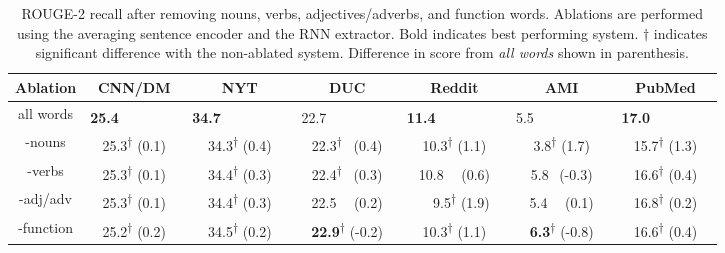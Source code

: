 \begin{table*}[ht]
\center
\begin{tabular}{ccccccc}
    \toprule
    \multirow{1}{*}{\textbf{Ablation}}  & \multicolumn{1}{c}{\textbf{CNN/DM}} & \multicolumn{1}{c}{\textbf{NYT}} & \multicolumn{1}{c}{\textbf{DUC}} & \multicolumn{1}{c}{\textbf{Reddit}} & \multicolumn{1}{c}{\textbf{AMI}} & \multicolumn{1}{c}{\textbf{PubMed}}\\
    \hline
    all words & \textbf{25.4}\textsuperscript{~} ~~~~~~~ & \textbf{34.7}\textsuperscript{~} ~~~~~~~~& 22.7\textsuperscript{~} ~~~~~~~~& \textbf{11.4}\textsuperscript{~} ~~~~~~~~& 5.5\textsuperscript{~} ~~~~~~~~~& \textbf{17.0}\textsuperscript{~} ~~~~~~~ \\
    -nouns & 25.3\textsuperscript{$\dagger$} \footnotesize{(0.1)}& 34.3\textsuperscript{$\dagger$} \footnotesize{(0.4)}& 22.3\textsuperscript{$\dagger$} ~\footnotesize{(0.4)}& 10.3\textsuperscript{$\dagger$} \footnotesize{(1.1)} & 3.8\textsuperscript{$\dagger$} \footnotesize{(1.7)}& 15.7\textsuperscript{$\dagger$} \footnotesize{(1.3)}\\
    -verbs & 25.3\textsuperscript{$\dagger$} \footnotesize{(0.1)}& 34.4\textsuperscript{$\dagger$} \footnotesize{(0.3)} & 22.4\textsuperscript{$\dagger$} ~\footnotesize{(0.3)}& 10.8\textsuperscript{~} ~\footnotesize{(0.6)} & 5.8\textsuperscript{~} \footnotesize{(-0.3)} & 16.6\textsuperscript{$\dagger$} \footnotesize{(0.4)}\\
    -adj/adv & 25.3\textsuperscript{$\dagger$} \footnotesize{(0.1)}& 34.4\textsuperscript{$\dagger$} \footnotesize{(0.3)} & 22.5\textsuperscript{~} ~\footnotesize{(0.2)} & ~~9.5\textsuperscript{$\dagger$} \footnotesize{(1.9)} & 5.4\textsuperscript{~} ~\footnotesize{(0.1)} & 16.8\textsuperscript{$\dagger$} \footnotesize{(0.2)}\\
    -function & 25.2\textsuperscript{$\dagger$} \footnotesize{(0.2)} & 34.5\textsuperscript{$\dagger$} \footnotesize{(0.2)} & \textbf{22.9}\textsuperscript{$\dagger$} \footnotesize{(-0.2)} & 10.3\textsuperscript{$\dagger$} \footnotesize{(1.1)}& \textbf{6.3}\textsuperscript{$\dagger$} \footnotesize{(-0.8)}& 16.6\textsuperscript{$\dagger$} \footnotesize{(0.4)}\\
    \bottomrule
\end{tabular}

\caption{ROUGE-2 recall after removing nouns, verbs, adjectives/adverbs, and 
    function words. Ablations are
    performed using the averaging sentence encoder and the RNN
extractor. 
Bold indicates best performing system. $\dagger$ indicates significant 
difference with the non-ablated system. Difference in score from \textit{all words} shown in parenthesis.}
\label{tab:ablations}
\end{table*}
